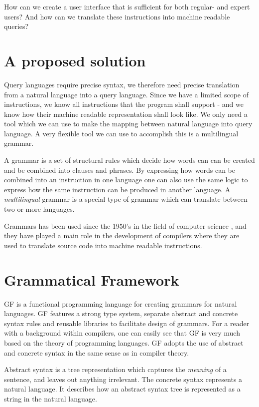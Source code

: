 How can we create a user interface that is sufficient for both regular- and expert users? And how can we translate these instructions into machine readable queries?

\section{A proposed solution}
Query languages require precise syntax, we therefore need precise translation from a natural language into a query language. Since we have a limited scope of instructions, we know all instructions that the program shall support - and we know how their machine readable representation shall look like. We only need a tool which we can use to make the mapping between natural language into query language. A very flexible tool we can use to accomplish this is a multilingual grammar. 

A grammar is a set of structural rules which decide how words can can be created and be combined into clauses and phrases. By expressing how words can be combined into an instruction in one language one can also use the same logic to express how the same instruction can be produced in another language. A \emph{multilingual} grammar is a special type of grammar which can translate between two or more languages.

Grammars has been used since the 1950's in the field of computer science \cite[p. 4]{ranta:2011}, and they have played a main role in the development of compilers where they are used to translate source code into machine readable instructions.

\section{Grammatical Framework}
\ac{GF} is a functional programming language for creating grammars for natural languages.\cite[p. 1]{ranta:2011} GF features a strong type system, separate abstract and concrete syntax rules and reusable libraries to facilitate design of grammars. For a reader with a background within compilers, one can easily see that GF is very much based on the theory of programming languages. GF adopts the use of abstract and concrete syntax in the same sense as in compiler theory. 

Abstract syntax is a tree representation which captures the \emph{meaning} of a sentence, and leaves out anything irrelevant. The concrete syntax represents a natural language. It describes how an abstract syntax tree is represented as a string in the natural language.

